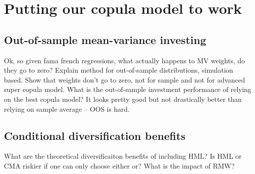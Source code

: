 
\section{Putting our copula model to work}
\label{sec:model_work}



\subsection{Out-of-sample mean-variance investing}
\label{subsec:mean_variance}

Ok, so given fama french regressions, what actually happens to MV weights, do they go to zero? Explain method for out-of-sample distributions, simulation based. Show that weights don't go to zero, not for sample and not for advanced super copula model. What is the out-of-sample investment performance of relying on the best copula model? It looks pretty good but not drastically better than relying on sample average -- OOS is hard.

\subsection{Conditional diversification benefits}
\label{subsec:cdb}

What are the theoretical diversificaiton benefits of including HML? Is HML or CMA riskier if one can only choose either or? What is the impact of RMW?